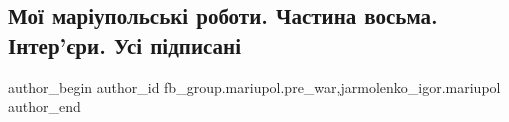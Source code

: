  
 
 
 
 

\subsection{Мої маріупольські роботи. Частина восьма. Інтер'єри. Усі підписані}
\label{sec:18_02_2023.fb.fb_group.mariupol.pre_war.2.mo__mar_upolsk__robo}
 
\ifcmt
 author_begin
   author_id fb_group.mariupol.pre_war,jarmolenko_igor.mariupol
 author_end
\fi

